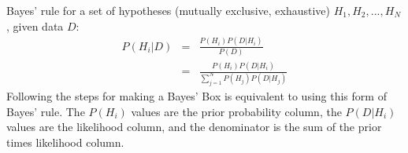 Bayes' rule for a set of hypotheses (mutually exclusive, exhaustive)
$H_1, H_2, ..., H_N$, given data $D$:
\begin{eqnarray}
P(H_i|D) &=& \frac{P(H_i)P(D|H_i)}{P(D)} \\
&=& \frac{P(H_i)P(D|H_i)}{\sum_{j=1}^N P(H_j)P(D|H_j)}
\end{eqnarray}
Following the steps for making a Bayes' Box is equivalent to using this form
of Bayes' rule. The $P(H_i)$ values are the prior probability column, the
$P(D|H_i)$ values are the likelihood column, and the denominator is the
sum of the prior times likelihood column.


